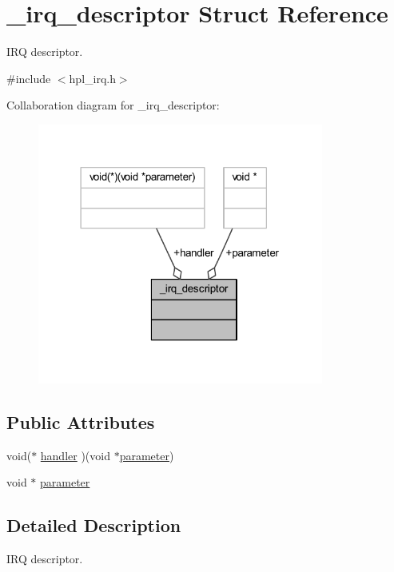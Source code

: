 \hypertarget{struct__irq__descriptor}{}\section{\+\_\+irq\+\_\+descriptor Struct Reference}
\label{struct__irq__descriptor}


I\+RQ descriptor.  




{\ttfamily \#include $<$hpl\+\_\+irq.\+h$>$}



Collaboration diagram for \+\_\+irq\+\_\+descriptor\+:\nopagebreak
\begin{figure}[H]
\begin{center}
\leavevmode
\includegraphics[width=266pt]{struct__irq__descriptor__coll__graph}
\end{center}
\end{figure}
\subsection*{Public Attributes}
\begin{DoxyCompactItemize}
\item 
void($\ast$ \hyperlink{struct__irq__descriptor_a5c5645efb32460ff3105eff8e6206b91}{handler} )(void $\ast$\hyperlink{struct__irq__descriptor_a9c58c3f373aebb6b725b9b47def981fd}{parameter})
\item 
void $\ast$ \hyperlink{struct__irq__descriptor_a9c58c3f373aebb6b725b9b47def981fd}{parameter}
\end{DoxyCompactItemize}


\subsection{Detailed Description}
I\+RQ descriptor. 

